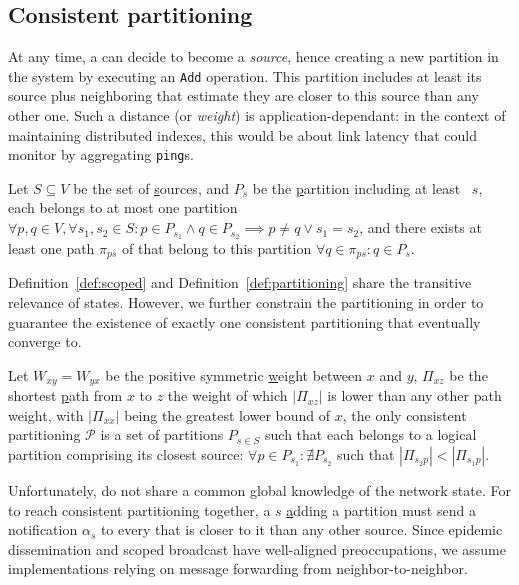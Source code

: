 

\subsection{Consistent partitioning}
\label{subsec:consistent}

At any time, a \process can decide to become a \emph{source}, hence
creating a new partition in the system by executing an \texttt{Add}
operation. This partition includes at least its source plus
neighboring \processes that estimate they are closer to this source
than any other one. Such a distance (or \emph{weight}) is
application-dependant: in the context of maintaining distributed
indexes, this would be about link latency that \nodes could monitor
by aggregating \texttt{ping}s.

\begin{definition}
  Let $S \subseteq V$ be the set of \underline{s}ources, and $P_s$ be
  the \underline{p}artition including at least \Process~$s$, each
  \process belongs to at most one partition $\forall p,q \in V, \forall
  s_1,s_2 \in S: p \in P_{s_1} \wedge q \in P_{s_2} \implies p \neq q
  \vee s_1 = s_2$, and there exists at least one path $\pi_{ps}$ of
  \processes that belong to this partition $\forall q \in \pi_{ps}: q
  \in P_s$.
\end{definition}

Definition~\ref{def:scoped} and Definition~\ref{def:partitioning}
share the transitive relevance of \process states. However, we further
constrain the partitioning in order to guarantee the existence of
exactly one consistent partitioning that \processes eventually converge
to.

\begin{definition}
  Let $W_{xy} = W_{yx}$ be the positive symmetric \underline{w}eight
  between $x$ and $y$, $\Pi_{xz}$ be the shortest \underline{p}ath
  from $x$ to $z$ the weight of which $|\Pi_{xz}|$ is lower than any
  other path weight, with $|\Pi_{xx}|$ being the greatest lower bound
  of $x$, the only consistent partitioning $\mathcal{P}$ is a set of
  partitions $P_{s\in S}$ such that each \process belongs to a logical
  partition comprising its closest source: $\forall p \in P_{s_1}:
  \nexists P_{s_2}$ such that $|\Pi_{s_2p}| < |\Pi_{s_1p}|$.
\end{definition}

Unfortunately, \processes do not share a common global knowledge of
the network state. For \processes to reach consistent partitioning
together, a \Process $s$ \underline{a}dding a partition must send a
notification $\alpha_s$ to every \process that is closer to it than
any other source. Since epidemic dissemination and scoped broadcast
have well-aligned preoccupations, we assume implementations relying on
message forwarding from neighbor-to-neighbor.

